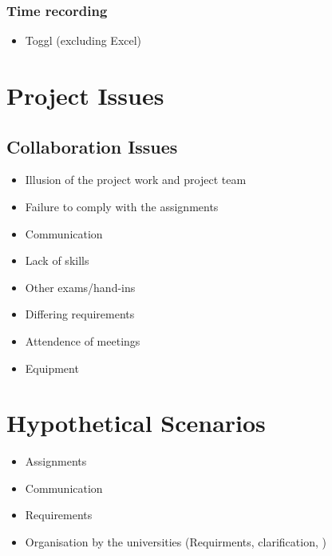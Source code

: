 \subsubsection {Time recording}
	\begin{itemize}
		\item Toggl (excluding Excel)
	\end{itemize}



\section{Project Issues}

\subsection{Collaboration Issues}

	\begin{itemize}

		\item Illusion of the project work and project team
		\item Failure to comply with the assignments
		\item Communication
		\item Lack of skills
		\item Other exams/hand-ins
		\item Differing requirements
		\item Attendence of meetings
		\item Equipment

	\end{itemize}


\section{Hypothetical Scenarios}

	\begin{itemize}
		\item Assignments
		\item Communication
		\item Requirements
		\item Organisation by the universities (Requirments, clarification, )
	\end{itemize}
